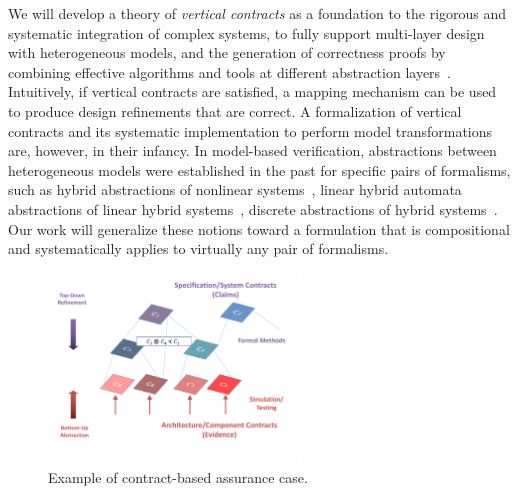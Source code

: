 We will develop a theory of \emph{vertical contracts} as a foundation to the rigorous and systematic integration of complex systems, to 
fully support  multi-layer design with heterogeneous models, and the generation of correctness proofs by combining effective algorithms and tools at different abstraction layers~\cite{Nuzzo15b}. Intuitively, if vertical contracts are satisfied, a mapping mechanism can be used to produce design refinements that are correct. A formalization of vertical contracts and its systematic implementation to perform model transformations are, however, in their infancy. In model-based verification, abstractions between heterogeneous models were established in the
past for specific pairs of formalisms, such as hybrid abstractions of nonlinear
systems~\cite{Henzinger98,Dang10}, linear hybrid automata abstractions of linear
hybrid systems~\cite{Frehse2008}, discrete abstractions of hybrid systems~\cite{Alur00,Alur2006,Chutinan01}.
Our work will generalize these notions toward a formulation that is compositional and systematically applies to virtually any pair of formalisms.

\begin{figure}
\vspace{-30pt}
\begin{center}
\includegraphics[width=0.6\textwidth,trim={0in 0.15in 0in 0in},clip]{./TA1/Contracts-Assurance-Case.pdf}
\vspace{-30pt}
\caption{Example of contract-based assurance case.}
\label{fig:assurance}
\end{center}
\vspace{-25pt}
\end{figure}

